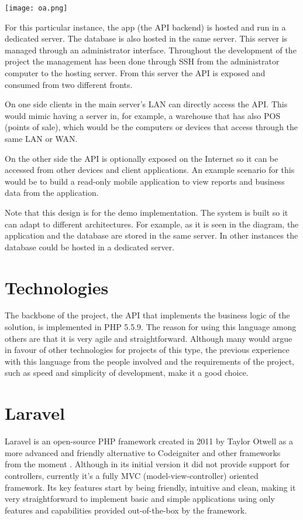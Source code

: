 \texttt{[image: oa.png]}

For this particular instance, the app (the API backend) is hosted and run in a dedicated server. The database is also hosted in the same server. This server is managed through an administrator interface. Throughout the development of the project the management has been done through SSH from the administrator computer to the hosting server. From this server the API is exposed and consumed from two different fronts. 

On one side clients in the main server’s LAN can directly access the API. This would mimic having a server in, for example, a warehouse that has also POS (points of sale), which would be the computers or devices that access through the same LAN or WAN.

On the other side the API is optionally exposed on the Internet so it can be accessed from other devices and client applications. An example scenario for this would be to build a read-only mobile application to view reports and business data from the application.

Note that this design is for the demo implementation. The system is built so it can adapt to different architectures. For example, as it is seen in the diagram, the application and the database are stored in the same server. In other instances the database could be hosted in a dedicated server.

\section{Technologies}
The backbone of the project, the API that implements the business logic of the solution, is implemented in PHP 5.5.9. The reason for using this language among others are that it is very agile and straightforward. Although many would argue in favour of other technologies for projects of this type, the previous experience with this language from the people involved and the requirements of the project, such as speed and simplicity of development, make it a good choice.

\section{Laravel}
Laravel is an open-source PHP framework created in 2011 by Taylor Otwell as a more advanced and friendly alternative to Codeigniter and other frameworks from the moment \cite{10}. Although in its initial version it did not provide support for controllers, currently it’s a fully MVC (model-view-controller) oriented framework. Its key features start by being friendly, intuitive and clean, making it very straightforward to implement basic and simple applications using only features and capabilities provided out-of-the-box by the framework.

